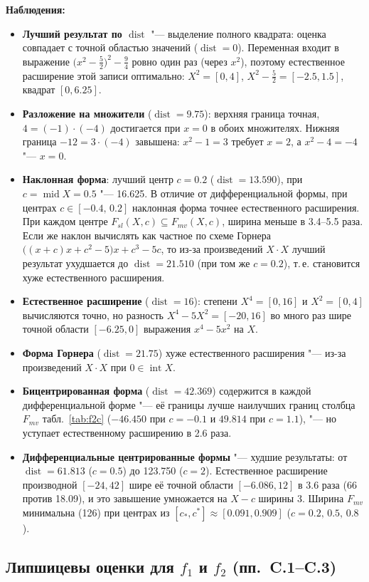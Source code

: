\documentclass[12pt,a4paper]{article}
\newcommand{\Mid}{\operatorname{mid}}
\newcommand{\dist}{\operatorname{dist}}
\newcommand{\inter}{\operatorname{int}}
\begin{document}
\textbf{Наблюдения:}
\begin{itemize}
\item \textbf{Лучший результат по $\dist$} "--- выделение полного квадрата: оценка совпадает с точной областью значений ($\dist=0$). Переменная входит в выражение $\bigl(x^2-\frac52\bigr)^2-\frac94$ ровно один раз (через $x^2$), поэтому естественное расширение этой записи оптимально: $X^2=[0,4]$, $X^2-\frac52=[-2.5,1.5]$, квадрат $[0,6.25]$.
\item \textbf{Разложение на множители} ($\dist=9.75$): верхняя граница точная, $4=(-1)\cdot(-4)$ достигается при $x=0$ в обоих множителях. Нижняя граница $-12=3\cdot(-4)$ завышена: $x^2-1=3$ требует $x=2$, а $x^2-4=-4$ "--- $x=0$.
\item \textbf{Наклонная форма}: лучший центр $c=0.2$ ($\dist=13.590$), при $c=\Mid X=0.5$ "--- 16.625. В отличие от дифференциальной формы, при центрах $c\in[-0.4,\,0.2]$ наклонная форма точнее естественного расширения. При каждом центре $F_{sl}(X,c)\subseteq F_{mv}(X,c)$, ширина меньше в 3.4--5.5 раза. Если же наклон вычислять как частное по схеме Горнера $\bigl((x+c)x+c^2-5\bigr)x+c^3-5c$, то из-за произведений $X\cdot X$ лучший результат ухудшается до $\dist=21.510$ (при том же $c=0.2$), т.\,е. становится хуже естественного расширения.
\item \textbf{Естественное расширение} ($\dist=16$): степени $X^4=[0,16]$ и $X^2=[0,4]$ вычисляются точно, но разность $X^4-5X^2=[-20,16]$ во много раз шире точной области $[-6.25,0]$ выражения $x^4-5x^2$ на $X$.
\item \textbf{Форма Горнера} ($\dist=21.75$) хуже естественного расширения "--- из-за произведений $X\cdot X$ при $0\in\inter X$.
\item \textbf{Бицентрированная форма} ($\dist=42.369$) содержится в каждой дифференциальной форме "--- её границы лучше наилучших границ столбца $F_{mv}$ табл.~\ref{tab:f2c} ($-46.450$ при $c=-0.1$ и $49.814$ при $c=1.1$), "--- но уступает естественному расширению в 2.6 раза.
\item \textbf{Дифференциальные центрированные формы} "--- худшие результаты: от $\dist=61.813$ ($c=0.5$) до 123.750 ($c=2$). Естественное расширение производной $[-24,42]$ шире её точной области $[-6.086,12]$ в 3.6 раза (66 против 18.09), и это завышение умножается на $X-c$ ширины 3. Ширина $F_{mv}$ минимальна (126) при центрах из $[c_{*},c^{*}]\approx[0.091,0.909]$ ($c=0.2,\,0.5,\,0.8$).
\end{itemize}

\subsection*{Липшицевы оценки для $f_1$ и $f_2$ (пп.~C.1--C.3)}
\end{document}
